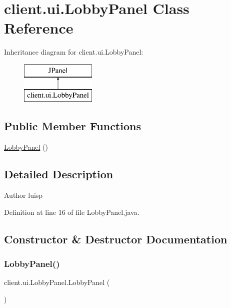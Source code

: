 \hypertarget{classclient_1_1ui_1_1_lobby_panel}{}\section{client.\+ui.\+Lobby\+Panel Class Reference}
\label{classclient_1_1ui_1_1_lobby_panel}
Inheritance diagram for client.\+ui.\+Lobby\+Panel\+:\begin{figure}[H]
\begin{center}
\leavevmode
\includegraphics[height=2.000000cm]{classclient_1_1ui_1_1_lobby_panel}
\end{center}
\end{figure}
\subsection*{Public Member Functions}
\begin{DoxyCompactItemize}
\item 
\hyperlink{classclient_1_1ui_1_1_lobby_panel_aa6432c40dfb52b11101ab3e1e7fbb30c}{Lobby\+Panel} ()
\end{DoxyCompactItemize}


\subsection{Detailed Description}
\begin{DoxyAuthor}{Author}
luisp 
\end{DoxyAuthor}


Definition at line 16 of file Lobby\+Panel.\+java.



\subsection{Constructor \& Destructor Documentation}
\hypertarget{classclient_1_1ui_1_1_lobby_panel_aa6432c40dfb52b11101ab3e1e7fbb30c}{}\label{classclient_1_1ui_1_1_lobby_panel_aa6432c40dfb52b11101ab3e1e7fbb30c} 
\subsubsection{\texorpdfstring{Lobby\+Panel()}{LobbyPanel()}}
{\footnotesize\ttfamily client.\+ui.\+Lobby\+Panel.\+Lobby\+Panel (\begin{DoxyParamCaption}{ }\end{DoxyParamCaption})}

